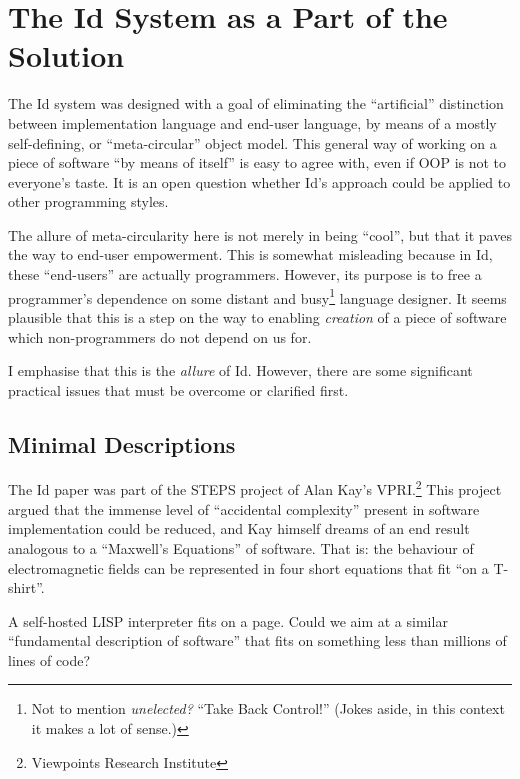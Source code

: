 \hypertarget{the-id-system-as-a-part-of-the-solution}{%
\section{The Id System as a Part of the
Solution}\label{the-id-system-as-a-part-of-the-solution}}

The Id{} system was designed with a goal of eliminating the
``artificial'' distinction between implementation language and end-user
language, by means of a mostly self-defining, or ``meta-circular''
object model. This general way of working on a piece of software ``by
means of itself'' is easy to agree with, even if OOP is not to
everyone's taste. It is an open question whether Id{}'s approach could
be applied to other programming styles.

The allure of meta-circularity here is not merely in being ``cool'', but
that it paves the way to end-user empowerment. This is somewhat
misleading because in Id{}, these ``end-users'' are actually
programmers. However, its purpose is to free a programmer's dependence
on some distant and busy\footnote{Not to mention \emph{unelected?}
  ``Take Back Control!'' (Jokes aside, in this context it makes a lot of
  sense.)} language designer. It seems plausible that this is a step on
the way to enabling \emph{creation} of a piece of software which
non-programmers do not depend on us for.

I emphasise that this is the \emph{allure} of Id{}. However, there are
some significant practical issues that must be overcome or clarified
first.

\hypertarget{minimal-descriptions}{%
\subsection{Minimal Descriptions}\label{minimal-descriptions}}

The Id{} paper was part of the STEPS project of Alan Kay's
VPRI.\footnote{Viewpoints Research Institute} This project argued that
the immense level of ``accidental complexity'' present in software
implementation could be reduced, and Kay himself dreams of an end result
analogous to a ``Maxwell's Equations'' of software. That is: the
behaviour of electromagnetic fields can be represented in four short
equations that fit ``on a T-shirt''.

A self-hosted LISP interpreter fits on a page. Could we aim at a similar
``fundamental description of software'' that fits on something less than
millions of lines of code?

